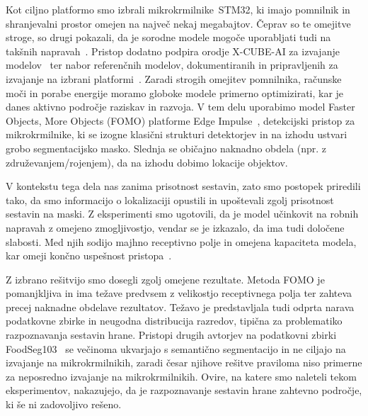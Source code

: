 \documentclass[a4paper,twoside,openright,12pt,slovene]{book}
\begin{document}

    Kot ciljno platformo smo izbrali
    mikrokrmilnike~STM32, ki imajo pomnilnik in shranjevalni prostor omejen na
    največ nekaj megabajtov. Čeprav so te omejitve stroge, so drugi pokazali, da je
    sorodne modele mogoče uporabljati tudi na takšnih
    napravah~\cite{src:Nikodinovska_2024}. Pristop dodatno podpira orodje
    X-CUBE-AI za izvajanje modelov~\cite{src:stxcubeai-docs} ter nabor
    referenčnih modelov, dokumentiranih in pripravljenih za izvajanje na
    izbrani platformi~\cite{src:stm32modelzoo}. Zaradi strogih omejitev
    pomnilnika, računske moči in porabe energije moramo globoke modele primerno
    optimizirati, kar je danes aktivno področje raziskav in razvoja. V tem delu
    uporabimo model Faster Objects, More Objects (FOMO) platforme Edge
    Impulse~\cite{src:announcingfomo}, detekcijski pristop za mikrokrmilnike,
    ki se izogne klasični strukturi detektorjev in na izhodu ustvari grobo
    segmentacijsko masko. Slednja se običajno naknadno obdela (npr. z
    združevanjem/rojenjem), da na izhodu dobimo lokacije objektov.

    V kontekstu tega dela nas zanima prisotnost sestavin, zato smo postopek
    priredili tako, da smo informacijo o lokalizaciji opustili in upoštevali
    zgolj prisotnost sestavin na maski. Z eksperimenti smo ugotovili, da je
    model učinkovit na robnih napravah z omejeno zmogljivostjo, vendar se je
    izkazalo, da ima tudi določene slabosti. Med njih sodijo majhno receptivno
    polje in omejena kapaciteta modela, kar omeji končno uspešnost
    pristopa~\cite{src:boyle2024dsort}.

    Z izbrano rešitvijo smo dosegli zgolj omejene rezultate. Metoda FOMO je
    pomanjkljiva in ima težave predvsem z velikostjo receptivnega polja ter
    zahteva precej naknadne obdelave rezultatov. Težavo je predstavljala tudi
    odprta narava podatkovne zbirke in neugodna distribucija razredov, tipična
    za problematiko razpoznavanja sestavin hrane. Pristopi drugih avtorjev na
    podatkovni zbirki FoodSeg103~\cite{src:wu2021large} se večinoma ukvarjajo s
    semantično segmentacijo in ne ciljajo na izvajanje na mikrokrmilnikih,
    zaradi česar njihove rešitve praviloma niso primerne za neposredno
    izvajanje na mikrokrmilnikih. Ovire, na katere smo naleteli tekom
    eksperimentov, nakazujejo, da je razpoznavanje sestavin hrane zahtevno
    področje, ki še ni zadovoljivo rešeno.
\end{document}
